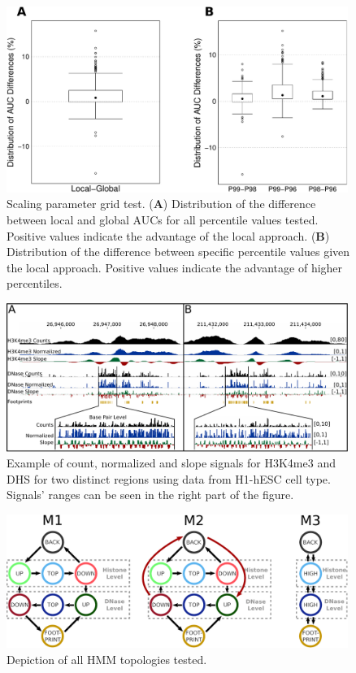 \documentclass{bioinfo}
\begin{document}
\begin{figure}[b]
\centering
     \includegraphics[width=0.99\textwidth]{Figs/NormType}
\caption{Scaling parameter grid test. (\textbf{A}) Distribution of the difference between local and global AUCs for all percentile values tested. Positive values indicate the advantage of the local approach. (\textbf{B}) Distribution of the difference between specific percentile values given the local approach. Positive values indicate the advantage of higher percentiles.}
\label{fig:norm.type}
\end{figure}

\begin{figure}[b]
\centering
     \includegraphics[width=0.99\textwidth]{Figs/NormSlope}
\caption{Example of count, normalized and slope signals for H3K4me3 and DHS for two distinct regions using data from H1-hESC cell type. Signals' ranges can be seen in the right part of the figure.}
\label{fig:normslope}
\end{figure}

\begin{figure}[t]
\centering
     \includegraphics[width=0.99\textwidth]{Figs/HMM_Topologies}
\caption{Depiction of all HMM topologies tested.}
\label{fig:hmm.topologies}
\end{figure}
\end{document}
